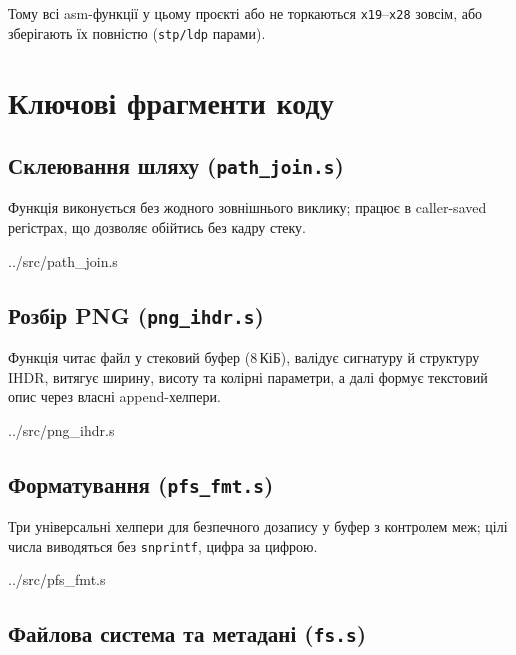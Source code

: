 \documentclass[12pt,a4paper]{article}
\begin{document}
Тому всі asm-функції у цьому проєкті або не торкаються
\texttt{x19}--\texttt{x28} зовсім, або зберігають їх повністю
(\texttt{stp/ldp} парами).

\section{Ключові фрагменти коду}

\subsection{Склеювання шляху (\texttt{path\_join.s})}

Функція виконується без жодного зовнішнього виклику; працює в
caller-saved регістрах, що дозволяє обійтись без кадру стеку.


{../src/path_join.s}

\subsection{Розбір PNG (\texttt{png\_ihdr.s})}

Функція читає файл у стековий буфер (8\,КіБ), валідує сигнатуру й
структуру IHDR, витягує ширину, висоту та колірні параметри,
а далі формує текстовий опис через власні append-хелпери.


{../src/png_ihdr.s}

\subsection{Форматування (\texttt{pfs\_fmt.s})}

Три універсальні хелпери для безпечного дозапису у буфер з
контролем меж; цілі числа виводяться без \texttt{snprintf},
цифра за цифрою.


{../src/pfs_fmt.s}

\subsection{Файлова система та метадані (\texttt{fs.s})}
\end{document}

